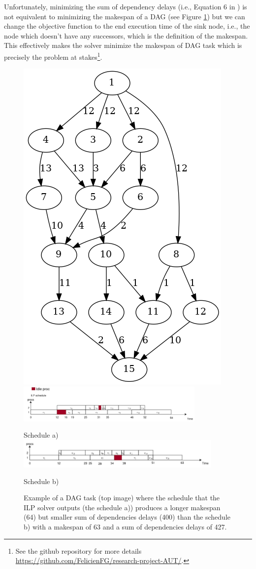 Unfortunately, minimizing the sum of dependency delays (i.e., Equation 6 in \citet{yip2023letsynchronise}) is not equivalent
to minimizing the makespan of a DAG (see Figure \ref{fig:counter_example_minsumdep})
but we can change the objective function to the end execution time
of the sink node, i.e., the node which doesn't have any successors,
which is the definition of the makespan.
This effectively makes the solver minimize the makespan of DAG task
which is precisely the problem at stakes\footnote{See the github repository for more details \url{https://github.com/FelicienFG/research-project-AUT/}.}.

\begin{figure}
    \centering
    \includegraphics[width=0.5\linewidth]{images/Tau_108.png}
    \includegraphics[width=\linewidth, height=70px]{images/schedule_ilp_fail_correct.png}
    \par Schedule a)
    \includegraphics[width=\linewidth, height=55px]{images/schedule_example_ilpfail_better.png}
    \par Schedule b)
    \caption{Example of a DAG task (top image) where the schedule that the ILP solver outputs (the schedule a))
    produces a longer makespan (64) but smaller sum of dependencies delays (400) than 
    the schedule b) with a makespan of 63 and a sum of dependencies delays of 427.}
    \label{fig:counter_example_minsumdep}
\end{figure}

